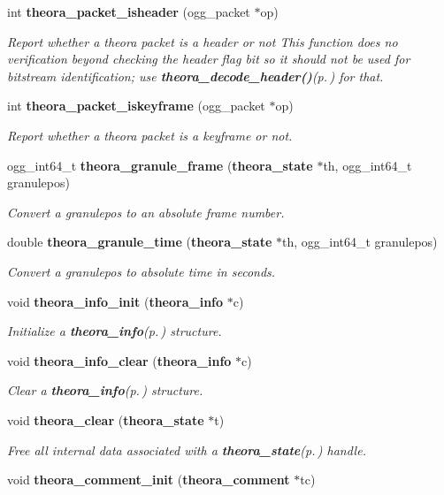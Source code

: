 \begin{CompactItemize}
int {\bf theora\_\-packet\_\-isheader} (ogg\_\-packet $\ast$op)
\begin{CompactList}\small\item\em Report whether a theora packet is a header or not This function does no verification beyond checking the header flag bit so it should not be used for bitstream identification; use {\bf theora\_\-decode\_\-header()}{\rm (p.\,\pageref{theora_8h_a21})} for that. \item\end{CompactList}\item 
int {\bf theora\_\-packet\_\-iskeyframe} (ogg\_\-packet $\ast$op)
\begin{CompactList}\small\item\em Report whether a theora packet is a keyframe or not. \item\end{CompactList}\item 
ogg\_\-int64\_\-t {\bf theora\_\-granule\_\-frame} ({\bf theora\_\-state} $\ast$th, ogg\_\-int64\_\-t granulepos)
\begin{CompactList}\small\item\em Convert a granulepos to an absolute frame number. \item\end{CompactList}\item 
double {\bf theora\_\-granule\_\-time} ({\bf theora\_\-state} $\ast$th, ogg\_\-int64\_\-t granulepos)
\begin{CompactList}\small\item\em Convert a granulepos to absolute time in seconds. \item\end{CompactList}\item 
void {\bf theora\_\-info\_\-init} ({\bf theora\_\-info} $\ast$c)
\begin{CompactList}\small\item\em Initialize a {\bf theora\_\-info}{\rm (p.\,\pageref{structtheora__info})} structure. \item\end{CompactList}\item 
void {\bf theora\_\-info\_\-clear} ({\bf theora\_\-info} $\ast$c)
\begin{CompactList}\small\item\em Clear a {\bf theora\_\-info}{\rm (p.\,\pageref{structtheora__info})} structure. \item\end{CompactList}\item 
void {\bf theora\_\-clear} ({\bf theora\_\-state} $\ast$t)
\begin{CompactList}\small\item\em Free all internal data associated with a {\bf theora\_\-state}{\rm (p.\,\pageref{structtheora__state})} handle. \item\end{CompactList}\item 
void {\bf theora\_\-comment\_\-init} ({\bf theora\_\-comment} $\ast$tc)\label{theora_8h_a32}


\end{CompactItemize}
